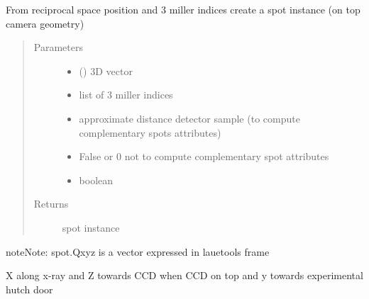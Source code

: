 \documentclass[letterpaper,10pt,english]{sphinxmanual}
\begin{document}

\begin{fulllineitems}
\label{\detokenize{Simulation_Module:LaueTools.lauecore.create_spot_np}}
From reciprocal space position and 3 miller indices
create a spot instance (on top camera geometry)
\begin{quote}\begin{description}
\item[{Parameters}] \leavevmode\begin{itemize}
\item {} 
 () \textendash{} 3D vector

\item {} 
 \textendash{} list of 3 miller indices

\item {} 
 \textendash{} approximate distance detector sample (to compute complementary spots attributes)

\item {} 
 \textendash{} False or 0  not to compute complementary spot attributes

\item {} 
 \textendash{} boolean

\end{itemize}

\item[{Returns}] \leavevmode
spot instance

\end{description}\end{quote}

\begin{sphinxadmonition}{note}{Note:}
spot.Qxyz is a vector expressed in lauetools frame
\end{sphinxadmonition}

X along x-ray and Z towards CCD when CCD on top and y towards experimental hutch door

\end{fulllineitems}
\end{document}
